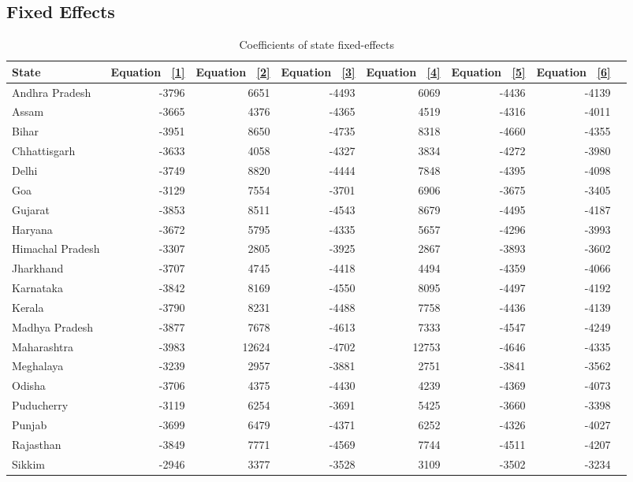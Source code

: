 \documentclass [12pt]{article}
\begin{document}
\subsection*{Fixed Effects}
\begin{table}[htbp]
    \centering
    \caption{Coefficients of state fixed-effects}
    \label{tab:5}
    \begin{tabular}{lrrrrrrr}
    \toprule
    \toprule
    State & Equation ~\ref{1} & Equation ~\ref{2} & Equation ~\ref{3} & Equation ~\ref{4} & Equation ~\ref{5} & Equation ~\ref{6} \\
    \midrule
    Andhra Pradesh & -3796 & 6651 & -4493 & 6069 & -4436 & -4139 \\
    Assam & -3665 & 4376 & -4365 & 4519 & -4316 & -4011 \\
    Bihar & -3951 & 8650 & -4735 & 8318 & -4660 & -4355 \\
    Chhattisgarh & -3633 & 4058 & -4327 & 3834 & -4272 & -3980 \\
    Delhi & -3749 & 8820 & -4444 & 7848 & -4395 & -4098 \\
    Goa & -3129 & 7554 & -3701 & 6906 & -3675 & -3405 \\
    Gujarat & -3853 & 8511 & -4543 & 8679 & -4495 & -4187 \\
    Haryana & -3672 & 5795 & -4335 & 5657 & -4296 & -3993 \\
    Himachal Pradesh & -3307 & 2805 & -3925 & 2867 & -3893 & -3602 \\
    Jharkhand & -3707 & 4745 & -4418 & 4494 & -4359 & -4066 \\
    Karnataka & -3842 & 8169 & -4550 & 8095 & -4497 & -4192 \\
    Kerala & -3790 & 8231 & -4488 & 7758 & -4436 & -4139 \\
    Madhya Pradesh & -3877 & 7678 & -4613 & 7333 & -4547 & -4249 \\
    Maharashtra & -3983 & 12624 & -4702 & 12753 & -4646 & -4335 \\
    Meghalaya & -3239 & 2957 & -3881 & 2751 & -3841 & -3562 \\
    Odisha & -3706 & 4375 & -4430 & 4239 & -4369 & -4073 \\
    Puducherry & -3119 & 6254 & -3691 & 5425 & -3660 & -3398 \\
    Punjab & -3699 & 6479 & -4371 & 6252 & -4326 & -4027 \\
    Rajasthan & -3849 & 7771 & -4569 & 7744 & -4511 & -4207 \\
    Sikkim & -2946 & 3377 & -3528 & 3109 & -3502 & -3234 \\

\end{tabular}
\end{table}
\end{document}
